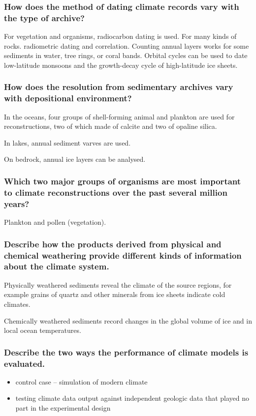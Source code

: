 \subsubsection{How does the method of dating climate records vary with the
type of archive?}
For vegetation and organisms, radiocarbon dating is used. For many kinds of
rocks. radiometric dating and correlation. Counting annual layers works for
some sediments in water, tree rings, or coral bands. Orbital cycles can be
used to date low-latitude monsoons and the growth-decay cycle of
high-latitude ice sheets.

\subsubsection{How does the resolution from sedimentary archives vary with
depositional environment?}
In the oceans, four groups of shell-forming animal and plankton are used for
reconstructions, two of which made of calcite and two of opaline silica.

In lakes, annual sediment varves are used.

On bedrock, annual ice layers can be analysed.

\subsubsection{Which two major groups of organisms are most important to
climate reconstructions over the past several million years?}

Plankton and pollen (vegetation).

\subsubsection{Describe how the products derived from physical and chemical
weathering provide different kinds of information about the climate system.}

Physically weathered sediments reveal the climate of the source regions, for
example grains of quartz and other minerals from ice sheets indicate cold
climates.

Chemically weathered sediments record changes in the global volume of ice and
in local ocean temperatures.

\subsubsection{Describe the two ways the performance of climate models is
evaluated.}
\begin{itemize}
	\item control case -- simulation of modern climate
	\item testing climate data output against independent geologic data
	that played no part in the experimental design
\end{itemize}

